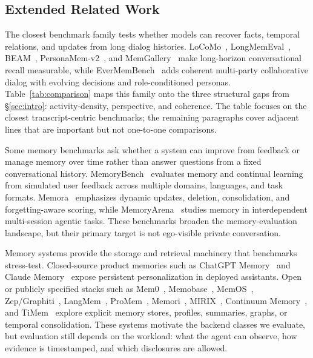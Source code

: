 \subsection{Extended Related Work}
\label{app:extended-related}

The closest benchmark family tests whether models can recover facts, temporal relations, and updates from long dialog histories.
LoCoMo~\citep{maharana2024evaluating}, LongMemEval~\citep{wu2025longmemeval}, BEAM~\citep{tavakoli2025beam}, PersonaMem-v2~\citep{jiang2025personamemv2}, and MemGallery~\citep{bei2026memgallery} make long-horizon conversational recall measurable, while EverMemBench~\citep{hu2026evermembench} adds coherent multi-party collaborative dialog with evolving decisions and role-conditioned personas.
Table~\ref{tab:comparison} maps this family onto the three structural gaps from \S\ref{sec:intro}: activity-density, perspective, and coherence.
The table focuses on the closest transcript-centric benchmarks; the remaining paragraphs cover adjacent lines that are important but not one-to-one comparisons.

Some memory benchmarks ask whether a system can improve from feedback or manage memory over time rather than answer questions from a fixed conversational history.
MemoryBench~\citep{memorybench2025} evaluates memory and continual learning from simulated user feedback across multiple domains, languages, and task formats.
Memora~\citep{uddin2026memora} emphasizes dynamic updates, deletion, consolidation, and forgetting-aware scoring, while MemoryArena~\citep{he2026memoryarena} studies memory in interdependent multi-session agentic tasks.
These benchmarks broaden the memory-evaluation landscape, but their primary target is not ego-visible private conversation.

Memory systems provide the storage and retrieval machinery that benchmarks stress-test.
Closed-source product memories such as ChatGPT Memory~\citep{openai2024chatgptmemory} and Claude Memory~\citep{anthropic2025claudememory} expose persistent personalization in deployed assistants.
Open or publicly specified stacks such as Mem0~\citep{mem0_2024}, Memobase~\citep{memobase2025}, MemOS~\citep{memos2025}, Zep/Graphiti~\citep{rasmussen2025zep,zep2025graphiti}, LangMem~\citep{langchain2025langmem}, ProMem~\citep{promem2026}, Memori~\citep{memori2026}, MIRIX~\citep{wang2025mirix}, Continuum Memory~\citep{logan2026continuum}, and TiMem~\citep{timem2025} explore explicit memory stores, profiles, summaries, graphs, or temporal consolidation.
These systems motivate the backend classes we evaluate, but evaluation still depends on the workload: what the agent can observe, how evidence is timestamped, and which disclosures are allowed.

